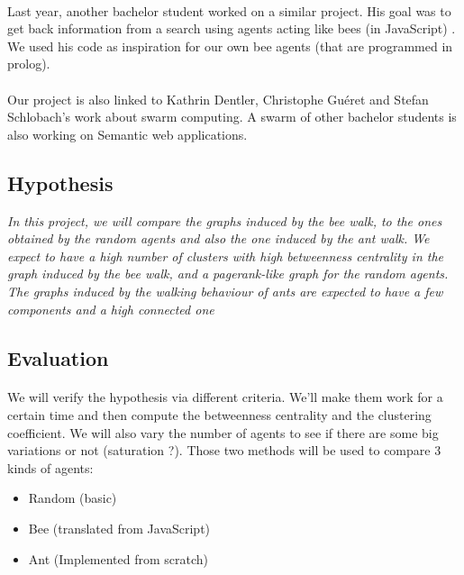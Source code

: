 \documentclass{article}
\newenvironment{itemh}[0]{\begin{itemize}[font=\color{mygray} \small]}{\end{itemize}}
\begin{document}
		\paragraph{} %
			Last year, another bachelor student worked on a similar project.
			His goal was to get back information from a search using agents acting like bees (in JavaScript) \cite{Kroes13,Kroes13-2}.
			We used his code as inspiration for our own bee agents (that are programmed in prolog).
		\paragraph{} %
			Our project is also linked to Kathrin Dentler, Christophe Gu\'eret and Stefan Schlobach's work
			about swarm computing\cite{Gueret10}.
			A swarm of other bachelor students is also working on Semantic web applications.
	\subsection{Hypothesis}
		\begin{center}
			\textit{
			In this project, we will compare the graphs induced by the bee walk,
			to the ones obtained by the random agents and also the one induced by the ant walk.
			We expect to have a high number of clusters with high betweenness centrality in the graph induced by the bee walk,
			and a pagerank-like graph for the random agents.
			The graphs induced by the walking behaviour of ants are expected to have a few components and a high connected one}
		\end{center}

	\subsection{Evaluation}
		\paragraph{}
			We will verify the hypothesis via different criteria.
			We'll make them work for a certain time and then compute the betweenness centrality and the clustering coefficient.
			We will also vary the number of agents to see if there are some big variations or not (saturation ?).
			Those two methods will be used to compare 3 kinds of agents:
		\begin{itemh}
			\item Random (basic)
			\item Bee (translated from JavaScript)
			\item Ant (Implemented from scratch)
		\end{itemh}
\end{document}
